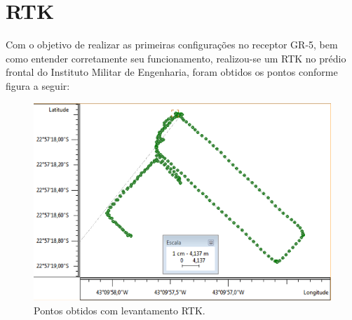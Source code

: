 \section{RTK}
Com o objetivo de realizar as primeiras configurações no receptor GR-5, bem como entender corretamente seu funcionamento, realizou-se um RTK no prédio frontal do Instituto Militar de Engenharia, foram obtidos os pontos conforme figura a seguir:

\begin{figure}[H]
\centering
\includegraphics[scale=0.55]{img/rtk/mapa_rtk.png}
\caption{Pontos obtidos com levantamento RTK.}
\label{}
\end{figure}


